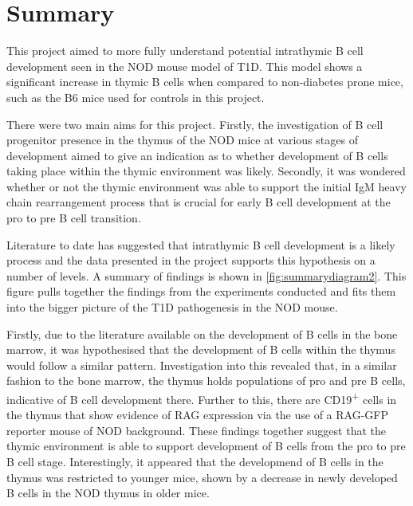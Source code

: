 





\section{Summary}

This project aimed to more fully understand potential intrathymic B cell development seen in the NOD mouse model of T1D.
This model shows a significant increase in thymic B cells when compared to non-diabetes prone mice, such as the B6 mice used for controls in this project.

There were two main aims for this project. Firstly, the investigation of B cell progenitor presence in the thymus of the NOD mice at various stages of development aimed to give an indication as to whether development of B cells taking place within the thymic environment was likely.
Secondly, it was wondered whether or not the thymic environment was able to support the initial IgM heavy chain rearrangement process that is crucial for early B cell development at the pro to pre B cell transition.

Literature to date has suggested that intrathymic B cell development is a likely process and the data presented in the project supports this hypothesis on a number of levels.
A summary of findings is shown in \cref{fig:summarydiagram2}.
This figure pulls together the findings from the experiments conducted and fits them into the bigger picture of the T1D pathogenesis in the NOD mouse.

Firstly, due to the literature available on the development of B cells in the bone marrow, it was hypothesised that the development of B cells within the thymus would follow a similar pattern.
Investigation into this revealed that, in a similar fashion to the bone marrow, the thymus holds populations of pro and pre B cells, indicative of B cell development there.
Further to this, there are CD19\textsuperscript{+} cells in the thymus that show evidence of RAG expression via the use of a RAG-GFP reporter mouse of NOD background.
These findings together suggest that the thymic environment is able to support development of B cells from the pro to pre B cell stage.
Interestingly, it appeared that the developmend of B cells in the thymus was restricted to younger mice, shown by a decrease in newly developed B cells in the NOD thymus in older mice.

